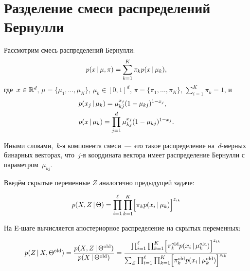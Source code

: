\documentclass[12pt,a4paper]{article}
\begin{document}

\section{Разделение смеси распределений Бернулли}

Рассмотрим смесь распределений Бернулли:
	\begin{equation*}
	p(x \mspace{3mu}{|}\mspace{3mu} \mu, \pi) = \sum_{k = 1}^{K} \pi_k p(x \mspace{3mu}{|}\mspace{3mu} \mu_k),
\end{equation*}
где~$x \in \mathbb{R}^d$, $\mu = \{\mu_1, \dots, \mu_K\}$, $\mu_k \in [0, 1]^d$, $\pi = \{\pi_1, \dots, \pi_K\}$, $\sum_{i = 1}^{K} \pi_k = 1$, и
\begin{align*}
&p(x_j \mspace{3mu}{|}\mspace{3mu} \mu_k) = \mu_{kj}^{x_j} (1 - \mu_{kj})^{1 - x_j},\\
&p(x \mspace{3mu}{|}\mspace{3mu} \mu_k) = \prod_{j = 1}^{d}\mu_{kj}^{x_j}(1 - \mu_{kj})^{1 - x_j}.
\end{align*}

Иными словами,~$k$-я компонента смеси~--- это такое распределение на~$d$-мерных бинарных векторах, что~$j$-я координата вектора имеет распределение Бернулли с параметром~$\mu_{kj}$.

Введём скрытые переменные $Z$ аналогично предыдущей задаче:


\begin{equation*}
p(X, Z \mspace{3mu}{|}\mspace{3mu} \Theta) = \prod_{i = 1}^{\ell}\prod_{k = 1}^{K} \Bigl[\pi_k p(x_i \mspace{3mu}{|}\mspace{3mu} \mu_k) \Bigr]^{z_{ik}}
\end{equation*}

На E-шаге вычисляется апостериорное распределение на скрытых переменных:

\begin{equation*}
	p(Z\mspace{3mu}{|}\mspace{3mu} X,\Theta^{\text{old}}) = \frac{p(X, Z\mspace{3mu}{|}\mspace{3mu} \Theta^{\text{old}})}{p(X\mspace{3mu}{|}\mspace{3mu} \Theta^{\text{old}})} = \frac{\prod_{i = 1}^{\ell}\prod_{k = 1}^{K} \Bigl[\pi_k^{\text{old}} p(x_i \mspace{3mu}{|}\mspace{3mu} \mu_k^{\text{old}}) \Bigr]^{z_{ik}}}{\sum_Z \prod_{i = 1}^{\ell}\prod_{k = 1}^{K} \Bigl[\pi_k^{\text{old}} p(x_i \mspace{3mu}{|}\mspace{3mu} \mu_k^{\text{old}}) \Bigr]^{z_{ik}}}
\end{equation*}
\end{document}
